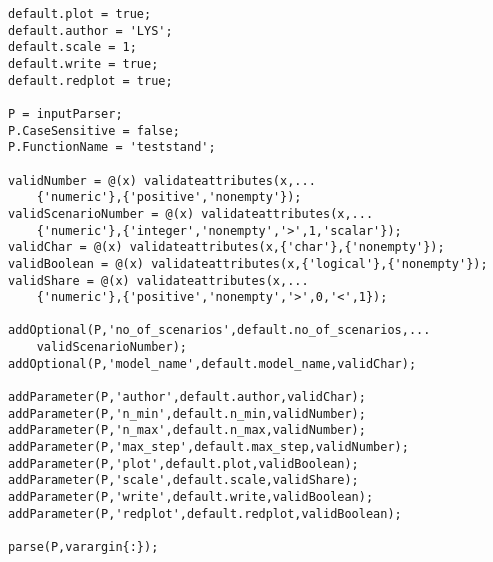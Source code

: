 \begin{lstlisting}
default.plot = true;
default.author = 'LYS';
default.scale = 1;
default.write = true;
default.redplot = true;

P = inputParser;
P.CaseSensitive = false;
P.FunctionName = 'teststand';

validNumber = @(x) validateattributes(x,...
    {'numeric'},{'positive','nonempty'});
validScenarioNumber = @(x) validateattributes(x,...
    {'numeric'},{'integer','nonempty','>',1,'scalar'});
validChar = @(x) validateattributes(x,{'char'},{'nonempty'});
validBoolean = @(x) validateattributes(x,{'logical'},{'nonempty'});
validShare = @(x) validateattributes(x,...
    {'numeric'},{'positive','nonempty','>',0,'<',1}); 

addOptional(P,'no_of_scenarios',default.no_of_scenarios,...
    validScenarioNumber);
addOptional(P,'model_name',default.model_name,validChar);

addParameter(P,'author',default.author,validChar);
addParameter(P,'n_min',default.n_min,validNumber);
addParameter(P,'n_max',default.n_max,validNumber);
addParameter(P,'max_step',default.max_step,validNumber);
addParameter(P,'plot',default.plot,validBoolean);
addParameter(P,'scale',default.scale,validShare);
addParameter(P,'write',default.write,validBoolean);
addParameter(P,'redplot',default.redplot,validBoolean);

parse(P,varargin{:});


\end{lstlisting}
